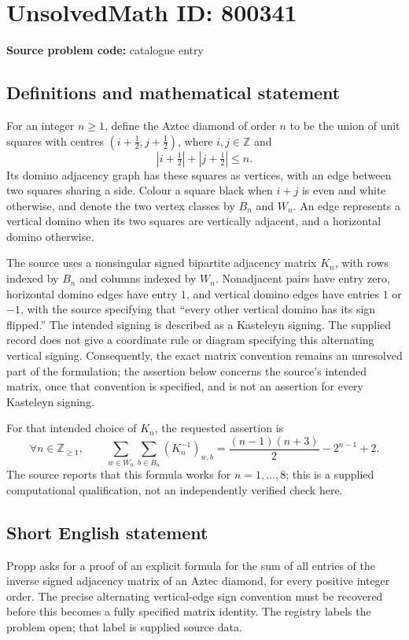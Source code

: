 \documentclass[11pt]{article}
\newcommand{\Z}{\mathbb{Z}}
\begin{document}
\section*{UnsolvedMath ID: 800341}
\textbf{Source problem code:} catalogue entry
\subsection{Definitions and mathematical statement}
For an integer \(n\geq 1\), define the Aztec diamond of order \(n\) to be the union of unit squares with centres \((i+\tfrac12,j+\tfrac12)\), where \(i,j\in\Z\) and
\[
\left|i+\tfrac12\right|+\left|j+\tfrac12\right|\leq n.
\]
Its domino adjacency graph has these squares as vertices, with an edge between two squares sharing a side. Colour a square black when \(i+j\) is even and white otherwise, and denote the two vertex classes by \(B_n\) and \(W_n\). An edge represents a vertical domino when its two squares are vertically adjacent, and a horizontal domino otherwise.

The source uses a nonsingular signed bipartite adjacency matrix \(K_n\), with rows indexed by \(B_n\) and columns indexed by \(W_n\). Nonadjacent pairs have entry zero, horizontal domino edges have entry \(1\), and vertical domino edges have entries \(1\) or \(-1\), with the source specifying that ``every other vertical domino has its sign flipped.'' The intended signing is described as a Kasteleyn signing. The supplied record does not give a coordinate rule or diagram specifying this alternating vertical signing. Consequently, the exact matrix convention remains an unresolved part of the formulation; the assertion below concerns the source's intended matrix, once that convention is specified, and is not an assertion for every Kasteleyn signing.

For that intended choice of \(K_n\), the requested assertion is
\[
\forall n\in\Z_{\geq 1},\qquad
\sum_{w\in W_n}\sum_{b\in B_n}(K_n^{-1})_{w,b}
=\frac{(n-1)(n+3)}{2}-2^{n-1}+2.
\]
The source reports that this formula works for \(n=1,\ldots,8\); this is a supplied computational qualification, not an independently verified check here.
\subsection{Short English statement}
Propp asks for a proof of an explicit formula for the sum of all entries of the inverse signed adjacency matrix of an Aztec diamond, for every positive integer order. The precise alternating vertical-edge sign convention must be recovered before this becomes a fully specified matrix identity. The registry labels the problem open; that label is supplied source data.
\end{document}
